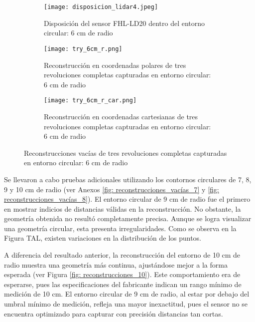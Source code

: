 \begin{figure}[H]
	\centering
	\begin{subfigure}{0.6\textwidth}
		\centering
		\texttt{[image: disposicion\_lidar4.jpeg]}
		\caption{Disposición del sensor FHL-LD20 dentro del entorno circular: 6 cm de radio}
		\label{disposicion_lidar4}
		\vspace{1em}
	\end{subfigure}
	\begin{subfigure}{0.45\textwidth}
		\centering
		\texttt{[image: try\_6cm\_r.png]}
		\caption{Reconstrucción en coordenadas polares de tres revoluciones completas capturadas en entorno circular: 6 cm de radio}
		\label{try_6cm_r}
	\end{subfigure}
	\hspace{1em}
	\begin{subfigure}{0.45\textwidth}
		\centering
		\texttt{[image: try\_6cm\_r\_car.png]}
		\caption{Reconstrucción en coordenadas cartesianas de tres revoluciones completas capturadas en entorno circular: 6 cm de radio}
		\label{try_6cm_r_car}
	\end{subfigure}
	\caption{Reconstrucciones vacías de tres revoluciones completas capturadas en entorno circular: 6 cm de radio}
	\label{fig: reconstrucciones_vacías_6}
\end{figure}


Se llevaron a cabo pruebas adicionales utilizando los contornos circulares de 7, 8, 9 y 10 cm de radio (ver Anexos \ref{fig: reconstrucciones_vacías_7} y \ref{fig: reconstrucciones_vacías_8}). El entorno circular de 9 cm de radio fue el primero en mostrar indicios de distancias válidas en la reconstrucción. No obstante, la geometría obtenida no resultó completamente precisa. Aunque se logra visualizar una geometría circular, esta presenta irregularidades. Como se observa en la Figura TAL, existen variaciones en la distribución de los puntos. 

A diferencia del resultado anterior, la reconstrucción del entorno de 10 cm de radio muestra una geometría más continua, ajustándose mejor a la forma esperada (ver Figura \ref{fig: reconstrucciones_10}). Este comportamiento era de esperarse, pues las especificaciones del fabricante indican un rango mínimo de medición de 10 cm. El entorno circular de 9 cm de radio, al estar por debajo del umbral mínimo de medición, refleja una mayor inexactitud, pues el sensor no se encuentra optimizado para capturar con precisión distancias tan cortas. 

